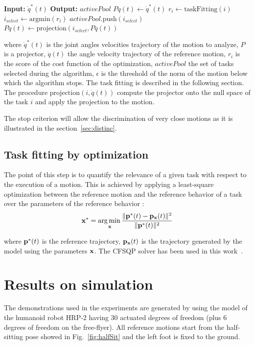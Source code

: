 \documentclass[letterpaper, 10pt, conference]{ieeeconf}      %
\begin{document}
\newcommand{\shOUTPUT}{\textbf{Output: }}
\newcommand{\shINPUT}{\textbf{Input: }}

\begin{algorithmic}
\STATE \shINPUT $\dot{q}^{*}(t)$
\STATE \shOUTPUT $activePool$
\STATE $P\dot{q}(t)\gets \dot{q}^{*}(t)$
    \STATE $r_i \gets \mathrm{taskFitting}(i)$
  \ENDFOR
  \STATE $i_{select} \gets \mathrm{argmin}(r_i)$
  \STATE $activePool.\mathrm{push}(i_{select})$
  \STATE $P\dot{q}(t) \gets \mathrm{projection}(i_{select}, P\dot{q}(t))$
\ENDWHILE
\end{algorithmic}
where  $\dot{q}^{*}(t)$ is the joint angles velocities trajectory of the motion to analyze,
$P$ is a projector, $\dot{q}(t)$ the angle velocity trajectory
of the reference motion, $r_i$ is the score of the cost function of the optimization, $activePool$
the set of tasks selected during the algorithm, $\epsilon$ is the threshold
of the norm of the motion below which the algorithm stops. The task fitting is described
in the following section. The procedure $\mathrm{projection}(i, \dot{q}(t))$ compute the projector onto
the null space of the task $i$ and apply the projection to the motion.

The stop criterion will allow the discrimination of very close motions as it is illustrated in
the section~\ref{sec:distinc}.

\subsection{Task fitting by optimization} \label{sec:alg2:proj}
The point of this step is to quantify the relevance of a given task with respect to
the execution of a motion. This is achieved by applying a least-square optimization
between the reference motion and the reference behavior of a task over the parameters
of the reference behavior :
\begin{equation}
	{\mathbf{x}}^* = \underset{{\mathbf{x}}}{\operatorname*{arg\,min\,}} \frac{\Vert {\mathbf{p}}^*(t) - {\mathbf{p}}_{\mathbf{x}}(t) \Vert^2}{\Vert {\mathbf{p}}^*(t) \Vert^2}
\label{optimProblem}
\end{equation}

\noindent where ${\mathbf{p}}^*(t)$ is the reference trajectory, ${\mathbf{p}}_{\mathbf{x}}(t)$ is the trajectory
generated by the model using the parameters ${\mathbf{x}}$. The CFSQP solver has been used in this work~\cite{lawrence97}.

\section{Results on simulation}
The demonstrations used in the experiments are generated by using the model
of the humanoid robot HRP-2 having 30 actuated degrees of freedom (plus 6 degrees of freedom on the
free-flyer). All reference motions start from the half-sitting pose showed in Fig.~\ref{fig:halfSit} and
the left foot is fixed to the ground.
\end{document}
